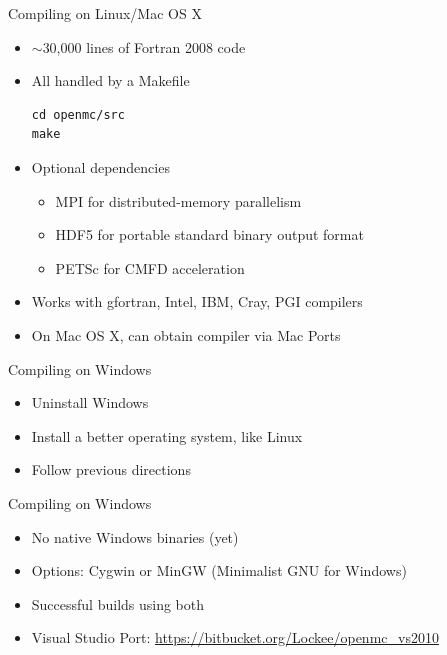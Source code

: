 \documentclass[serif]{beamer}
\begin{document}

\begin{frame}[fragile]{Compiling on Linux/Mac OS X}
  \begin{itemize}
  \vfill
  \item<1-> $\sim$30,000 lines of Fortran 2008 code
  \vfill
  \item<1-> All handled by a Makefile
\begin{lstlisting}
cd openmc/src
make
\end{lstlisting}
  \vfill
  \item<1-> Optional dependencies
    \begin{itemize}
    \item<1-> MPI for distributed-memory parallelism
    \item<1-> HDF5 for portable standard binary output format
    \item<1-> PETSc for CMFD acceleration
    \end{itemize}
  \vfill
  \item<1-> Works with gfortran, Intel, IBM, Cray, PGI compilers
  \vfill
  \item<1-> On Mac OS X, can obtain compiler via Mac Ports
  \vfill
  \end{itemize}
\end{frame}


\begin{frame}{Compiling on Windows}
  \begin{itemize}
  \item<1-> Uninstall Windows
  \item<1-> Install a better operating system, like Linux
  \item<1-> Follow previous directions
  \end{itemize}
\end{frame}


\begin{frame}{Compiling on Windows}
  \begin{itemize}
  \vfill
  \item<1-> No native Windows binaries (yet)
  \vfill
  \item<1-> Options: Cygwin or MinGW (Minimalist GNU for Windows)
  \vfill
  \item<1-> Successful builds using both
  \vfill
  \item<1-> Visual Studio Port:
    \url{https://bitbucket.org/Lockee/openmc\_vs2010}
  \vfill
  \end{itemize}
\end{frame}
\end{document}
